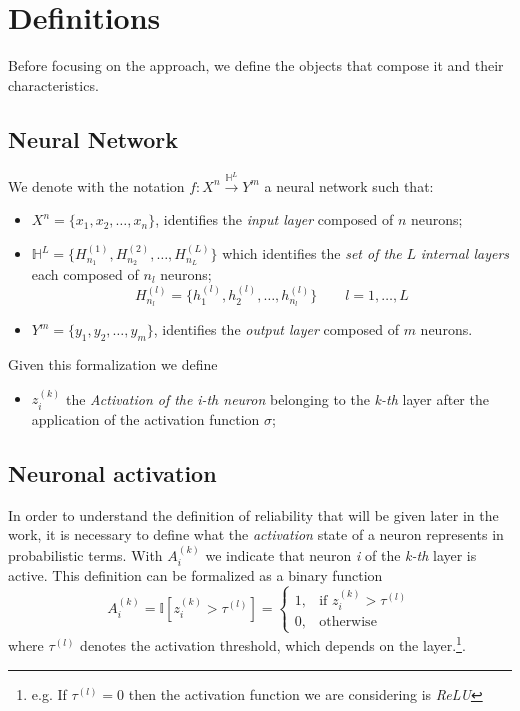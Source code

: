 \documentclass[10pt]{article} %
\begin{document}
\section{Definitions}
\label{assunzioni}
Before focusing on the approach, we define the objects that compose it and their characteristics.

\subsection{Neural Network}
\label{A1-FeedForward}
We denote with the notation $f: X^{n} \xrightarrow{\mathbb{H}^{L}} Y^{m}$ a neural network such that:
\begin{itemize}
    \item $X^{n} = \{x_{1}, x_{2}, \dots, x_{n}\}$, identifies the \textit{input layer} composed of $n$ neurons;
    \item $\mathbb{H}^{L} = \{H^{(1)}_{n_{1}}, H^{(2)}_{n_{2}}, \dots, H^{(L)}_{n_{L}}\}$ which identifies the \textit{set of the} $L$ \textit{internal layers} each composed of $n_{l}$ neurons;
    \begin{equation}
        H^{(l)}_{n_{l}} = \{h^{(l)}_{1}, h^{(l)}_{2}, \dots, h^{(l)}_{n_{l}}\}\qquad l = 1, \dots, L
    \end{equation}
    \item $Y^{m} = \{y_{1}, y_{2}, \dots, y_{m}\}$, identifies the \textit{output layer} composed of $m$ neurons.
\end{itemize}
Given this formalization we define
\begin{itemize}
    \item $z^{(k)}_{i}$ the \textit{Activation of the} \textit{i-th neuron} belonging to the \textit{k-th} layer after the application of the activation function $\sigma$;
\end{itemize}

\subsection{Neuronal activation}
\label{A2-Attivazione}
In order to understand the definition of reliability that will be given later in the work, it is necessary to define what the \textit{activation} state of a neuron represents in probabilistic terms. With $A^{(k)}_{i}$ we indicate that neuron \textit{i} of the \textit{k-th} layer is active. This definition can be formalized as a binary function
\begin{equation}
    A^{(k)}_{i} = \mathbb{I}[z^{(k)}_{i} > \tau^{(l)}] = 
    \begin{cases} 
        1, & \mbox{if }z^{(k)}_{i} > \tau^{(l)} \\ 
        0, & \mbox{otherwise}
    \end{cases}
\end{equation}
where $\tau^{(l)}$ denotes the activation threshold, which depends on the layer.\footnote{e.g. If $\tau^{(l)} = 0$ then the activation function we are considering is \textit{ReLU}}.
\end{document}
